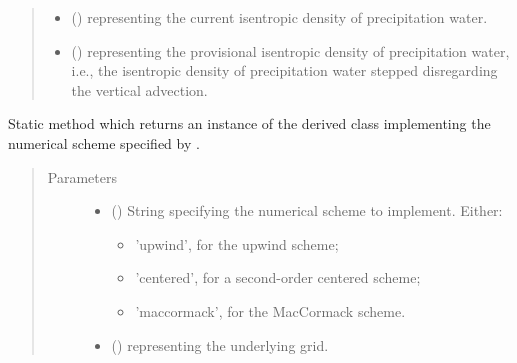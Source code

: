 \documentclass[letterpaper,10pt,english]{sphinxmanual}
\begin{document}
\begin{fulllineitems}
\begin{fulllineitems}
\begin{quote}
\begin{description}
\begin{itemize}
\item {} 
 () \textendash{}  representing the current isentropic density of precipitation water.

\item {} 
 () \textendash{}  representing the provisional isentropic density of precipitation water,
i.e., the isentropic density of precipitation water stepped disregarding the vertical advection.

\end{itemize}

\end{description}\end{quote}

\end{fulllineitems}


\begin{fulllineitems}
\label{\detokenize{api:dycore.flux_isentropic.FluxIsentropic.factory}}
Static method which returns an instance of the derived class implementing the numerical scheme
specified by .
\begin{quote}\begin{description}
\item[{Parameters}] \leavevmode\begin{itemize}
\item {} 
 () \textendash{} 
String specifying the numerical scheme to implement. Either:
\begin{itemize}
\item {} 
’upwind’, for the upwind scheme;

\item {} 
’centered’, for a second-order centered scheme;

\item {} 
’maccormack’, for the MacCormack scheme.

\end{itemize}


\item {} 
 () \textendash{} {\hyperref[\detokenize{api:grids.grid_xyz.GridXYZ}]{}} representing the underlying grid.


\end{itemize}
\end{description}
\end{quote}
\end{fulllineitems}
\end{fulllineitems}
\end{document}
